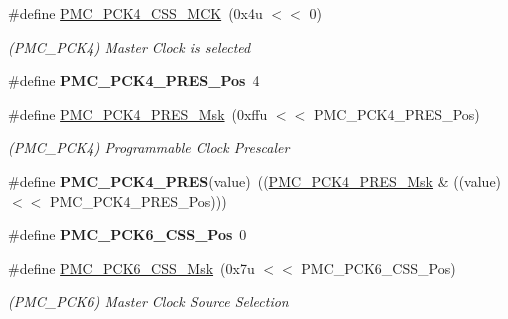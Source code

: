 \begin{DoxyCompactItemize}
\mbox{\label{group__SAMS70__PMC_ga362912ba92017c57a17b5e2286588684}} 
\#define \mbox{\hyperlink{group__SAMS70__PMC_ga362912ba92017c57a17b5e2286588684}{P\+M\+C\+\_\+\+P\+C\+K4\+\_\+\+C\+S\+S\+\_\+\+M\+CK}}~(0x4u $<$$<$ 0)
\begin{DoxyCompactList}\small\item\em (P\+M\+C\+\_\+\+P\+C\+K4) Master Clock is selected \end{DoxyCompactList}\item 
\mbox{\label{group__SAMS70__PMC_ga25fd2d8e840e448094995aa178ce50a7}} 
\#define {\bfseries P\+M\+C\+\_\+\+P\+C\+K4\+\_\+\+P\+R\+E\+S\+\_\+\+Pos}~4
\item 
\mbox{\label{group__SAMS70__PMC_gadb4d2b23b9a41b5d6060a313615a0446}} 
\#define \mbox{\hyperlink{group__SAMS70__PMC_gadb4d2b23b9a41b5d6060a313615a0446}{P\+M\+C\+\_\+\+P\+C\+K4\+\_\+\+P\+R\+E\+S\+\_\+\+Msk}}~(0xffu $<$$<$ P\+M\+C\+\_\+\+P\+C\+K4\+\_\+\+P\+R\+E\+S\+\_\+\+Pos)
\begin{DoxyCompactList}\small\item\em (P\+M\+C\+\_\+\+P\+C\+K4) Programmable Clock Prescaler \end{DoxyCompactList}\item 
\mbox{\label{group__SAMS70__PMC_ga8ba996eb88856bc85bfeba11db8e40c7}} 
\#define {\bfseries P\+M\+C\+\_\+\+P\+C\+K4\+\_\+\+P\+R\+ES}(value)~((\mbox{\hyperlink{group__SAMS70__PMC_gadb4d2b23b9a41b5d6060a313615a0446}{P\+M\+C\+\_\+\+P\+C\+K4\+\_\+\+P\+R\+E\+S\+\_\+\+Msk}} \& ((value) $<$$<$ P\+M\+C\+\_\+\+P\+C\+K4\+\_\+\+P\+R\+E\+S\+\_\+\+Pos)))
\item 
\mbox{\label{group__SAMS70__PMC_ga1471f83b96d2704ae87ee9c669686863}} 
\#define {\bfseries P\+M\+C\+\_\+\+P\+C\+K6\+\_\+\+C\+S\+S\+\_\+\+Pos}~0
\item 
\mbox{\label{group__SAMS70__PMC_ga73701c54834b3fedebedda192dcf0a4a}} 
\#define \mbox{\hyperlink{group__SAMS70__PMC_ga73701c54834b3fedebedda192dcf0a4a}{P\+M\+C\+\_\+\+P\+C\+K6\+\_\+\+C\+S\+S\+\_\+\+Msk}}~(0x7u $<$$<$ P\+M\+C\+\_\+\+P\+C\+K6\+\_\+\+C\+S\+S\+\_\+\+Pos)
\begin{DoxyCompactList}\small\item\em (P\+M\+C\+\_\+\+P\+C\+K6) Master Clock Source Selection \end{DoxyCompactList}\item 

\end{DoxyCompactItemize}
